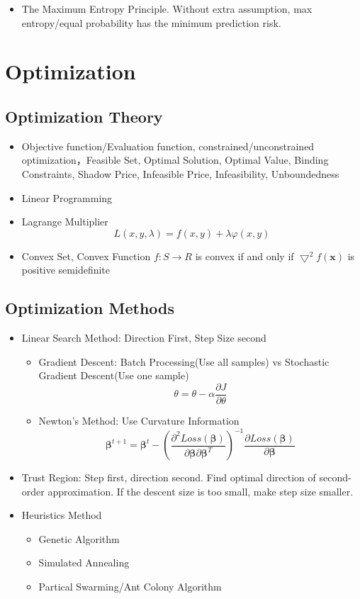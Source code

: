 \documentclass[11pt, openany]{book}              %
\begin{document}
\begin{itemize}
    \item The Maximum Entropy Principle. Without extra assumption, max entropy/equal probability has the minimum prediction risk. 
\end{itemize}
 
\section{Optimization}

\subsection{Optimization Theory}

\begin{itemize}
    \item Objective function/Evaluation function, constrained/unconstrained optimization，Feasible Set, Optimal Solution, Optimal Value, Binding Constraints, Shadow Price, Infeasible Price, Infeasibility, Unboundedness    
    \item Linear Programming
    \item Lagrange Multiplier $$L(x,y,\lambda) = f(x,y) + \lambda \varphi(x,y) $$
    \item Convex Set, Convex Function $f:S\to R$ is convex if and only if $\bigtriangledown^2 f(\mathbf{x})$ is positive semidefinite 
\end{itemize}

\subsection{Optimization Methods}

\begin{itemize}
    \item Linear Search Method: Direction First, Step Size second	
    	\begin{itemize}  		
    		\item Gradient Descent: Batch Processing(Use all samples) vs Stochastic Gradient Descent(Use one sample)
    		$$ \theta = \theta - \alpha \frac{\partial J }{ \partial \theta }$$
    		\item Newton's Method: Use Curvature Information 
    		$$ \mathbold{\beta}^{t+1} = \mathbold{\beta}^t - (\frac{\partial^2 Loss(\mathbold{\beta})}{\partial \mathbold{\beta} \partial\mathbold{\beta}^T})^{-1} \frac{ \partial Loss(\mathbold{\beta})}{\partial \mathbold{\beta}} $$
   		\end{itemize}
   	\item Trust Region: Step first, direction second. Find optimal direction of second-order approximation. If the descent size is too small, make step size smaller.
   	\item Heuristics Method
   		\begin{itemize}  		
	    	\item Genetic Algorithm
	 	   	\item Simulated Annealing 
	    	\item Partical Swarming/Ant Colony Algorithm
	    \end{itemize}
\end{itemize}
\end{document}
